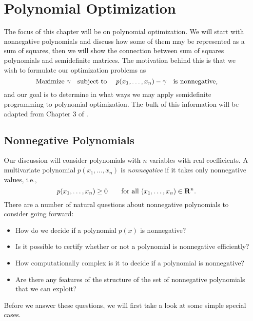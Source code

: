 

	\chapter{Polynomial Optimization}		%
	\label{PolyOpchap}		%
	
	 The focus of this chapter will be on polynomial optimization. We will start with nonnegative polynomials and discuss how some of them may be represented as a sum of squares, then we will show the connection between sum of squares polynomials and semidefinite matrices. The motivation behind this is that we wish to formulate our optimization problems as
	 $$
	 \textnormal{Maximize } \gamma \quad \textnormal{subject to } \quad p(x_1, \dots, x_n) - \gamma \quad \textnormal{is nonnegative},
	 $$
	 and our goal is to determine in what ways we may apply semidefinite programming to polynomial optimization. The bulk of this information will be adapted from Chapter 3 of \cite{BlekhermanGrigoriy;ParriloPabloA.;Thomas2013}.
	 
	 \section{Nonnegative Polynomials}
	 
	Our discussion will consider polynomials with $n$ variables with real coefficients. A multivariate polynomial $p(x_1, \dots, x_n)$ is \emph{nonnegative} if it takes only nonnegative values, i.e., 
	\begin{equation}
		p(x_1, \dots, x_n) \geq 0 \qquad \textnormal{for all } (x_1, \dots, x_n) \in \mathbf{R}^n.
	\end{equation}
	There are a number of natural questions about nonnegative polynomials to consider going forward:
	\begin{itemize}
		\item How do we decide if a polynomial $p(x)$ is nonnegative?
		
		\item Is it possible to certify whether or not a polynomial is nonnegative efficiently?
		
		\item How computationally complex is it to decide if a polynomial is nonnegative?
		
		\item Are there any features of the structure of the set of nonnegative polynomials that we can exploit?
	\end{itemize}
	Before we answer these questions, we will first take a look at some simple special cases.
	
